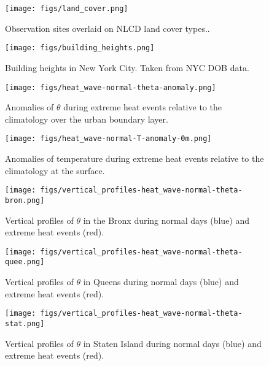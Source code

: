 \documentclass[num-refs]{wiley-article}
\begin{document}
\begin{figure}[ht]
	\centering
	\texttt{[image: figs/land\_cover.png]}
	\caption{Observation sites overlaid on NLCD land cover types..}
	\label{fig:land_cover}
\end{figure}
 
\begin{figure}[ht]
	\centering
	\texttt{[image: figs/building\_heights.png]}
	\caption{Building heights in New York City. Taken from NYC DOB data.}
	\label{fig:building_heights}
\end{figure}


\begin{figure}[ht]
	\centering
	\texttt{[image: figs/heat\_wave-normal-theta-anomaly.png]}
	\caption{Anomalies of $\theta$ during extreme heat events relative to the climatology over the urban boundary layer.}
	\label{fig:extreme-heat-normal-comparison-contours-theta}
\end{figure}
\begin{figure}[ht]
	\centering
	\texttt{[image: figs/heat\_wave-normal-T-anomaly-0m.png]}
	\caption{Anomalies of temperature during extreme heat events relative to the climatology at the surface.}
	\label{fig:extreme_heat_normal_0m_comparison_T}
\end{figure}
\begin{figure}[ht]
	\centering
	\texttt{[image: figs/vertical\_profiles-heat\_wave-normal-theta-bron.png]}
	\caption{Vertical profiles of $\theta$ in the Bronx during normal days (blue) and extreme heat events (red).}
	\label{fig:vertical_profiles-heat_wave-normal-theta-bron}
\end{figure}
\begin{figure}[ht]
	\centering
	\texttt{[image: figs/vertical\_profiles-heat\_wave-normal-theta-quee.png]}
	\caption{Vertical profiles of $\theta$ in Queens during normal days (blue) and extreme heat events (red).}
	\label{fig:vertical_profiles-heat_wave-normal-theta-quee}
\end{figure}
\begin{figure}[ht]
	\centering
	\texttt{[image: figs/vertical\_profiles-heat\_wave-normal-theta-stat.png]}
	\caption{Vertical profiles of $\theta$ in Staten Island during normal days (blue) and extreme heat events (red).}
	\label{fig:vertical_profiles-heat_wave-normal-theta-stat}
\end{figure}
\end{document}
